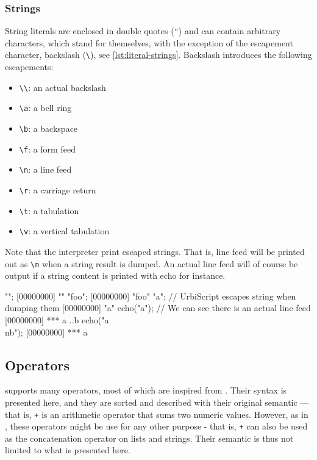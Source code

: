 \subsubsection{Strings}

String literals are enclosed in double quotes (\lstinline|"|) and can contain
arbitrary characters, which stand for themselves, with the exception
of the escapement character, backslash (\lstinline|\|), see
\autoref{lst:literal-strings}. Backslash introduces the following escapements:

\begin{itemize}
  \item \lstinline |\\|: an actual backslash
  \item \lstinline|\a|: a bell ring
  \item \lstinline|\b|: a backspace
  \item \lstinline|\f|: a form feed
  \item \lstinline|\n|: a line feed
  \item \lstinline|\r|: a carriage return
  \item \lstinline|\t|: a tabulation
  \item \lstinline|\v|: a vertical tabulation
\end{itemize}

Note that the interpreter print escaped strings. That is, line feed
will be printed out as \lstinline|\n| when a string result is
dumped. An actual line feed will of course be output if a string
content is printed with echo for instance.

\begin{urbiscript}[caption=Literal strings,label=lst:literal-strings,float=\floatpos]
"";
[00000000] ""
"foo";
[00000000] "foo"
"a\nb"; // UrbiScript escapes string when dumping them
[00000000] "a\nb"
echo("a\nb"); // We can see there is an actual line feed
[00000000] *** a
..b
echo("a\\nb");
[00000000] *** a\nb
\end{urbiscript}

\subsection{Operators}

\us supports many operators, most of which are inspired from
\Cxx. Their syntax is presented here, and they are sorted and
described with their original semantic --- that is, \lstinline|+| is an
arithmetic operator that sums two numeric values. However, as in \Cxx,
these operators might be use for any other purpose - that is,
\lstinline|+| can also be used as the concatenation operator on lists
and strings. Their semantic is thus not limited to what is presented
here.

